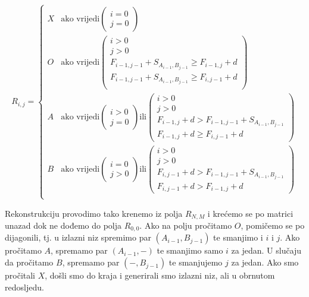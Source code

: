 \documentclass[times, utf8, zavrsni]{fer}
\begin{document}
$$
R_{i,j} = \left\{
	\begin{array}{ll}
		X & \mbox{ako vrijedi} \left( \begin{array}{l} i=0 \\ j=0 \end{array} \right) \\
		O & \mbox{ako vrijedi} \left( \begin{array}{l} i>0 \\ j>0 \\
				F_{i-1,j-1} + S_{A_{i-1}, B_{j-1}} \geq F_{i-1,j} + d \\
				F_{i-1,j-1} + S_{A_{i-1}, B_{j-1}} \geq F_{i,j-1} + d \\
			\end{array} \right) \\
		A & \mbox{ako vrijedi} \left( \begin{array}{l} i>0 \\ j=0 \end{array} \right)
			\mbox{ili} \left( \begin{array}{l} i>0 \\ j>0 \\
				F_{i-1,j} + d > F_{i-1,j-1} + S_{A_{i-1}, B_{j-1}} \\
				F_{i-1,j} + d \geq F_{i,j-1} + d
			\end{array} \right) \\
		B & \mbox{ako vrijedi} \left( \begin{array}{l} i=0 \\ j>0 \end{array} \right)
			\mbox{ili} \left( \begin{array}{l} i>0 \\ j>0 \\
				F_{i,j-1} + d > F_{i-1,j-1} + S_{A_{i-1}, B_{j-1}} \\
				F_{i,j-1} + d > F_{i-1,j} + d
			\end{array} \right) \\
	\end{array}
\right.
$$

Rekonstrukciju provodimo tako krenemo iz polja $R_{N,M}$ i krećemo se
po matrici unazad dok ne dođemo do polja $R_{0,0}$. Ako na polju pročitamo $O$,
pomičemo se po dijagonili, tj. u izlazni niz spremimo par $(A_{i-1}, B_{j-1})$ te
smanjimo i $i$ i $j$. Ako pročitamo $A$, spremamo par $(A_{i-1}, -)$ te smanjimo
samo $i$ za jedan. U slučaju da pročitamo $B$, spremamo par $(-, B_{j-1})$ te
smanjujemo $j$ za jedan. Ako smo pročitali $X$, došli smo do kraja i generirali
smo izlazni niz, ali u obrnutom redosljedu. 
\end{document}
